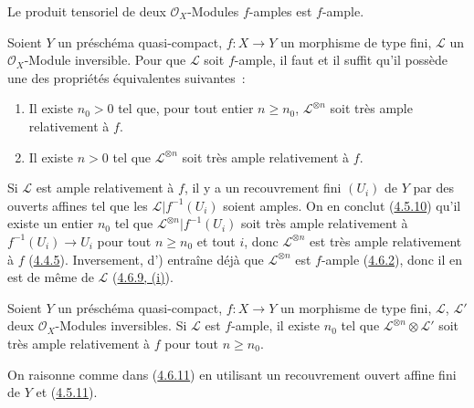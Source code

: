 \begin{corollary}[4.6.10]
\label{II.4.6.10-fr}
Le produit tensoriel de deux $\mathcal{O}_X$-Modules $f$-amples est
$f$-ample.
\end{corollary}

\begin{proposition}[4.6.11]
\label{II.4.6.11-fr}
Soient $Y$ un préschéma quasi-compact, $f:X\to Y$ un morphisme de type
fini, $\mathcal{L}$ un $\mathcal{O}_X$-Module inversible. Pour que
$\mathcal{L}$ soit $f$-ample, il faut et il suffit qu'il possède une des
propriétés équivalentes suivantes~:
\begin{enumerate}
  \item[\rm{d)}] Il existe $n_0>0$ tel que, pour tout entier $n\geq n_0$,
  $\mathcal{L}^{\otimes n}$ soit très ample relativement à $f$.
  \item[\rm{d')}] Il existe $n>0$ tel que $\mathcal{L}^{\otimes n}$ soit
  très ample relativement à $f$.
\end{enumerate}
\end{proposition}

Si $\mathcal{L}$ est ample relativement à $f$, il y a un recouvrement fini
$(U_i)$ de $Y$ par des ouverts affines tel que les
$\mathcal{L}|f^{-1}(U_i)$ soient amples. On en conclut
(\hyperref[II.4.5.10-fr]{4.5.10}) qu'il existe un entier $n_0$ tel que
$\mathcal{L}^{\otimes n}|f^{-1}(U_i)$ soit très ample relativement à
$f^{-1}(U_i)\to U_i$ pour tout $n\geq n_0$ et tout $i$, donc
$\mathcal{L}^{\otimes n}$ est très ample relativement à $f$
(\hyperref[II.4.4.5-fr]{4.4.5}). Inversement, d') entraîne déjà que
$\mathcal{L}^{\otimes n}$ est $f$-ample
(\hyperref[II.4.6.2-fr]{4.6.2}), donc il en est de même de $\mathcal{L}$
(\hyperref[II.4.6.9-fr]{4.6.9, (i)}).

\begin{corollary}[4.6.12]
\label{II.4.6.12-fr}
Soient $Y$ un préschéma quasi-compact, $f:X\to Y$ un morphisme de type
fini, $\mathcal{L}$, $\mathcal{L}'$ deux $\mathcal{O}_X$-Modules
inversibles. Si $\mathcal{L}$ est $f$-ample, il existe $n_0$ tel que
$\mathcal{L}^{\otimes n}\otimes\mathcal{L}'$ soit très ample relativement
à $f$ pour tout $n\geq n_0$.
\end{corollary}

On raisonne comme dans (\hyperref[II.4.6.11-fr]{4.6.11}) en utilisant un
recouvrement ouvert affine fini de $Y$ et
(\hyperref[II.4.5.11-fr]{4.5.11}).

